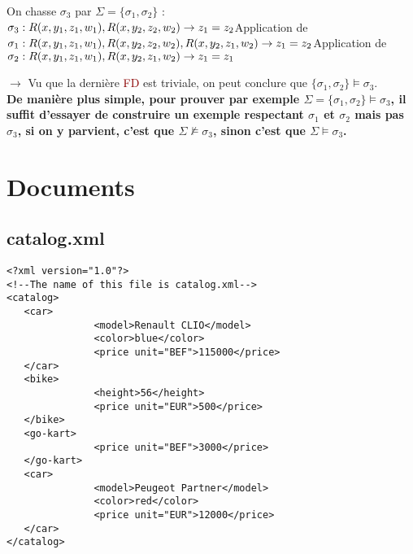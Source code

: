 \documentclass{article}
\newcommand{\red}[1]{\textcolor{darkred}{#1}}
\begin{document}
\noindent On chasse $\sigma_3$ par $\Sigma = \{\sigma_1,\sigma_2\}$ : \\

\noindent $ \sigma_3 : R(x, y_1 , z_1 , w_1 ), R(x, y_2 , z_2 , w_2 ) \rightarrow z_1 = z_2 \\
$Application de $\sigma_1 : R(x, y_1 , z_1 , w_1 ), R(x, y_2 , z_2 , w_2 ), R(x, y_2 , z_1 , w_2 ) \rightarrow z_1 = z_2\\
$Application de $\sigma_2 : R(x, y_1 , z_1 , w_1 ), R(x, y_2 , z_1 , w_2 ) \rightarrow z_1 = z_1 \\$

\noindent $\rightarrow$ Vu que la dernière \red{FD} est triviale, on peut conclure que $\{\sigma_1,\sigma_2\} \models \sigma_3$. \\

\noindent \textbf{De manière plus simple, pour prouver par exemple $\Sigma = \{\sigma_1,\sigma_2\} \models \sigma_3$, il suffit d'essayer de construire un exemple 
respectant $\sigma_1$ et $\sigma_2$ mais pas $\sigma_3$, si on y parvient, c'est que $\Sigma \not \models \sigma_3$, sinon c'est que $\Sigma \models \sigma_3$.}

\appendix

\section{Documents}

\subsection{catalog.xml}
\begin{verbatim}
<?xml version="1.0"?>
<!--The name of this file is catalog.xml-->
<catalog>
   <car>
               <model>Renault CLIO</model>
               <color>blue</color>
               <price unit="BEF">115000</price>
   </car>
   <bike>   
               <height>56</height>
               <price unit="EUR">500</price>
   </bike>
   <go-kart>
               <price unit="BEF">3000</price>
   </go-kart>
   <car>       
               <model>Peugeot Partner</model>
               <color>red</color>
               <price unit="EUR">12000</price>
   </car>
</catalog>
\end{verbatim}
\end{document}
